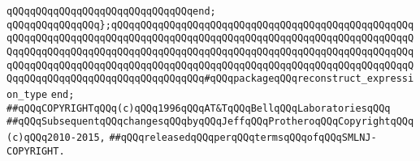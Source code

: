 \verb|qQQqqQQqqQQqqQQqqQQqqQQqqQQqqQQqend;|\newline
\newline
\verb|qQQqqQQqqQQqqQQq};qQQqqQQqqQQqqQQqqQQqqQQqqQQqqQQqqQQqqQQqqQQqqQQqqQQqqQQqqQQqqQQqqQQqqQQqqQQqqQQqqQQqqQQqqQQqqQQqqQQqqQQqqQQqqQQqqQQqqQQqqQQqqQQqqQQqqQQqqQQqqQQqqQQqqQQqqQQqqQQqqQQqqQQqqQQqqQQqqQQqqQQqqQQqqQQqqQQqqQQqqQQqqQQqqQQqqQQqqQQqqQQqqQQqqQQqqQQqqQQqqQQqqQQqqQQqqQQqqQQqqQQqqQQqqQQqqQQqqQQqqQQqqQQqqQQqqQQq#qQQqpackageqQQqreconstruct_expression_type|\newline
\verb|end;|\newline
\newline
\newline
\newline
\verb|##qQQqCOPYRIGHTqQQq(c)qQQq1996qQQqAT&TqQQqBellqQQqLaboratoriesqQQq|\newline
\verb|##qQQqSubsequentqQQqchangesqQQqbyqQQqJeffqQQqProtheroqQQqCopyrightqQQq(c)qQQq2010-2015,|\newline
\verb|##qQQqreleasedqQQqperqQQqtermsqQQqofqQQqSMLNJ-COPYRIGHT.|\newline

